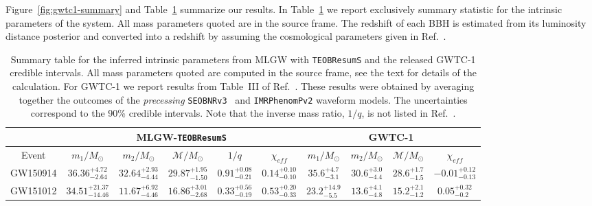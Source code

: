 Figure~\ref{fig:gwtc1-summary} and Table~\ref{tab:summary} summarize our results. 
In Table~\ref{tab:summary} we report exclusively  summary statistic for the intrinsic 
parameters of the system. All mass parameters quoted are in the source frame. 
The redshift of each BBH is estimated from its luminosity distance posterior and converted 
into a redshift by assuming the cosmological parameters given in Ref.~\cite{}.
\begin{table}[t]
\centering
\caption{Summary table for the inferred intrinsic parameters from MLGW with {\tt TEOBResumS} and the released GWTC-1 credible intervals. 
All mass parameters quoted are computed in the source frame, see the text for details of the calculation. For GWTC-1 we report results 
from Table~III  of Ref.~\cite{LigoScientific:2018mvr}. These results were obtained by averaging together the outcomes of the 
{\it precessing} {\tt SEOBNRv3}~\cite{Babak:2016tgq} and {\tt IMRPhenomPv2} waveform models. 
The uncertainties correspond to the 90\% credible intervals.
Note that the inverse mass ratio, $1/q$, is not listed in Ref.~\cite{LIGOScientific:2018mvr}.}
\label{tab:summary}
\begin{ruledtabular}
\begin{tabular}{cccccccccc}
                              & \multicolumn{5}{c}{MLGW-{\tt TEOBResumS}}                                                   & \multicolumn{4}{c|}{GWTC-1}                                                \\ 
                              \hline
Event    & $m_1/M_\odot$ & $m_2/M_\odot$ & $\mathcal{M}/M_\odot$ & $1/q$ & $\chi_{eff}$ & $m_1/M_\odot$ & $m_2/M_\odot$ & $\mathcal{M}/M_\odot$ & $\chi_{eff}$
\\ \hline
\vspace{1.0 mm}
GW150914 & $36.36_{-2.64}^{+4.72}$& $32.64_{-4.44}^{+2.93}$& $29.87_{-1.50}^{+1.95}$& $0.91_{-0.21}^{+0.08}$& $0.14_{-0.10}^{+0.10}$&    $35.6_{-3.1}^{+4.7}$           &   $30.6_{-4.4}^{+3.0}$            & $28.6_{-1.5}^{+1.7}$                      & $-0.01_{-0.13}^{+0.12}$              \\
\vspace{1.0 mm}
GW151012 & $34.51_{-14.46}^{+21.37}$& $11.67_{-4.46}^{+6.92}$& $16.86_{-2.68}^{+3.01}$& $0.33_{-0.19}^{+0.56}$& $0.53_{-0.33}^{+0.20}$&   $23.2_{-5.5}^{+14.9}$            &   $13.6_{-4.8}^{+4.1}$            &  $15.2_{-1.2}^{+2.1}$                     &  $0.05_{-0.2}^{+0.32}$              \\

\end{tabular}
\end{ruledtabular}
\end{table}
